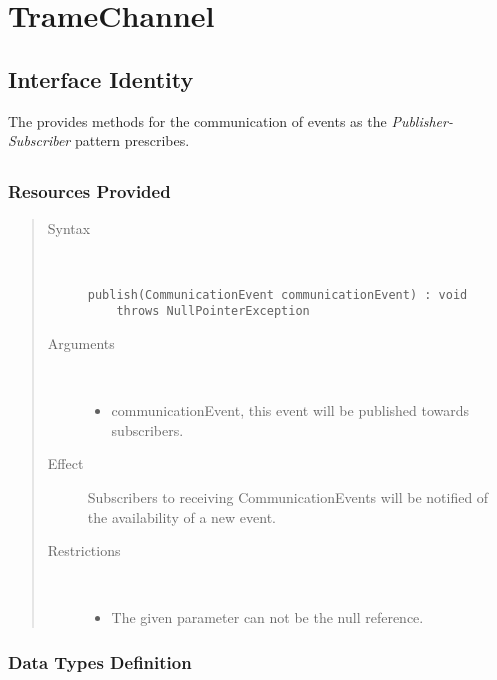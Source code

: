 \section{TrameChannel}
\label{api:rm-trame-channel}

\subsection{Interface Identity}

\npar The  provides methods for the communication of
events as the \emph{Publisher-Subscriber} pattern prescribes.

\subsection{}

\subsubsection{Resources Provided}

\begin{quote}
	\begin{description}
		\item[Syntax] \
		\begin{verbatim}
publish(CommunicationEvent communicationEvent) : void
    throws NullPointerException
		\end{verbatim}
		\item[Arguments] \
		\begin{itemize}
		  \item communicationEvent, this event will be published towards subscribers.
		\end{itemize}
		\item[Effect] Subscribers to receiving CommunicationEvents will be notified of
		the availability of a new event. 
		\item[Restrictions] \
		\begin{itemize}
		  \item The given parameter can not be the null reference.
		\end{itemize}
	\end{description} 
\end{quote}

\subsubsection{Data Types Definition}

